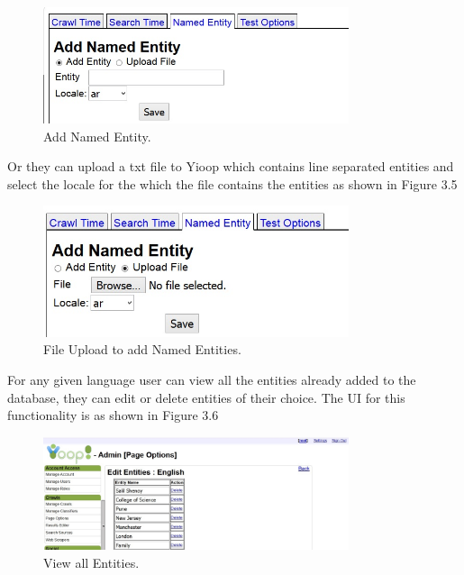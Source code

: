 \begin{figure}[htb]
\centering
\includegraphics[width=0.8\textwidth]{images/named_entity_manual.jpg}
\caption{Add Named Entity.} 
\label{fig:named_entity_manual}
\end{figure}

Or they can upload a txt file to Yioop which contains line separated entities and select the locale for the which the file contains the entities as shown in Figure 3.5

\begin{figure}[htb]
\centering
\includegraphics[width=0.8\textwidth]{images/named_entity_file.jpg}
\caption{File Upload to add Named Entities.} 
\label{fig:named_entity_file}
\end{figure}

For any given language user can view all the entities already added to the database, they can edit or delete entities of their choice. The UI for this functionality is as shown in Figure 3.6

\begin{figure}[htb]
\centering
\includegraphics[width=0.8\textwidth]{images/viewallentities.jpg}
\caption{View all Entities.} 
\label{fig:viewallentities}
\end{figure}
